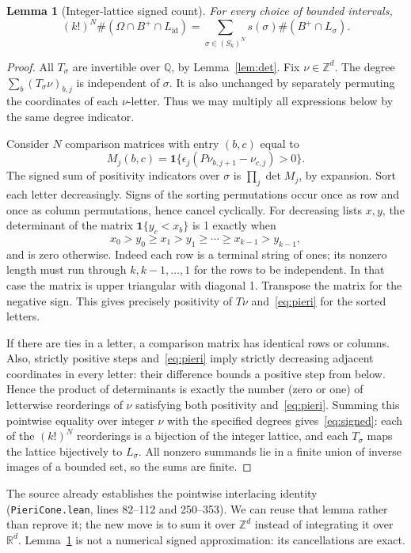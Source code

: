 \documentclass[11pt]{article}
\newtheorem{lemma}[theorem]{Lemma}
\theoremstyle{remark}\newtheorem{remark}[theorem]{Remark}
\newcommand{\Z}{\mathbb Z}\newcommand{\N}{\mathbb N}\newcommand{\R}{\mathbb R}
\newcommand{\code}[1]{\texttt{#1}}
\begin{document}
\begin{lemma}[Integer-lattice signed count]\label{lem:signed}
For every choice of bounded intervals,
\begin{equation}\label{eq:signed}
 (k!)^N\#(\Omega\cap B^+\cap L_{\mathrm{id}})
 =\sum_{\sigma\in(S_k)^N}s(\sigma)\#(B^+\cap L_\sigma).
\end{equation}
\end{lemma}
\begin{proof}
All $T_\sigma$ are invertible over $\mathbb Q$, by Lemma~\ref{lem:det}. Fix $\nu\in\Z^d$. The degree $\sum_b(T_\sigma\nu)_{b,j}$ is independent of $\sigma$. It is also unchanged by separately permuting the coordinates of each $\nu$-letter. Thus we may multiply all expressions below by the same degree indicator.

Consider $N$ comparison matrices with entry $(b,c)$ equal to
\[
 M_j(b,c)=\mathbf1\{\epsilon_j(P\nu_{b,j+1}-\nu_{c,j})>0\}.
\]
The signed sum of positivity indicators over $\sigma$ is $\prod_j\det M_j$, by expansion. Sort each letter decreasingly. Signs of the sorting permutations occur once as row and once as column permutations, hence cancel cyclically. For decreasing lists $x,y$, the determinant of the matrix $\mathbf1\{y_c<x_b\}$ is 1 exactly when
\[
 x_0>y_0\geq x_1>y_1\geq\cdots\geq x_{k-1}>y_{k-1},
\]
and is zero otherwise. Indeed each row is a terminal string of ones; its nonzero length must run through $k,k-1,\ldots,1$ for the rows to be independent. In that case the matrix is upper triangular with diagonal 1. Transpose the matrix for the negative sign. This gives precisely positivity of $T\nu$ and~\eqref{eq:pieri} for the sorted letters.

If there are ties in a letter, a comparison matrix has identical rows or columns. Also, strictly positive steps and~\eqref{eq:pieri} imply strictly decreasing adjacent coordinates in every letter: their difference bounds a positive step from below. Hence the product of determinants is exactly the number (zero or one) of letterwise reorderings of $\nu$ satisfying both positivity and~\eqref{eq:pieri}. Summing this pointwise equality over integer $\nu$ with the specified degrees gives~\eqref{eq:signed}: each of the $(k!)^N$ reorderings is a bijection of the integer lattice, and each $T_\sigma$ maps the lattice bijectively to $L_\sigma$. All nonzero summands lie in a finite union of inverse images of a bounded set, so the sums are finite.
\end{proof}

The source already establishes the pointwise interlacing identity (\code{PieriCone.lean}, lines 82--112 and 250--353). We can reuse that lemma rather than reprove it; the new move is to sum it over $\Z^d$ instead of integrating it over $\R^d$. Lemma~\ref{lem:signed} is not a numerical signed approximation: its cancellations are exact.
\end{document}
